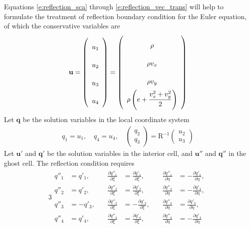 \documentclass[a4paper,12pt,dvips]{article}
\begin{document}
Equations \ref{e:reflection_sca} through \ref{e:reflection_vec_trans} will help
to formulate the treatment of reflection boundary condition for the Euler
equation, of which the conservative variables are
\begin{align*}
\renewcommand{\arraystretch}{2.2}
\mathbf{u} = \left(\begin{array}{c}
  u_1 \\ u_2 \\ u_3 \\ u_4
\end{array}\right)
= \left(\begin{array}{c}
  \rho \\ \rho v_x \\ \rho v_y \\
  \rho\left(e + \dfrac{v_x^2 + v_y^2}{2}\right)
\end{array}\right)
\end{align*}
Let $\mathbf{q}$ be the solution variables in the local coordinate system
\begin{align*}
q_1 = u_1, \quad q_4 = u_4, \quad
\left(\begin{array}{c}
  q_2 \\ q_3
\end{array}\right)
= \mathrm{R}^{-1} \left(\begin{array}{c}
  u_2 \\ u_3
\end{array}\right)
\end{align*}
Let $\mathbf{u}'$ and $\mathbf{q}'$ be the solution variables in the interior
cell, and $\mathbf{u}''$ and $\mathbf{q}''$ in the ghost cell.  The reflection
condition requires
\begin{alignat*}{3}
\begin{aligned}
  q''_1
  &= q'_1, \quad
  &\frac{\partial q''_1}{\partial\xi}
  &= \frac{\partial q'_1}{\partial\xi}, \quad
  &\frac{\partial q''_1}{\partial\eta}
  &= -\frac{\partial q'_1}{\partial\eta}, \\
  q''_2
  &= q'_2, \quad
  &\frac{\partial q''_2}{\partial\xi}
  &= \frac{\partial q'_2}{\partial\xi}, \quad
  &\frac{\partial q''_2}{\partial\eta}
  &= -\frac{\partial q'_2}{\partial\eta}, \\
  q''_3
  &= -q'_3, \quad
  &\frac{\partial q''_3}{\partial\xi}
  &= -\frac{\partial q'_3}{\partial\xi}, \quad
  &\frac{\partial q''_3}{\partial\eta}
  &= \frac{\partial q'_3}{\partial\eta}, \\
  q''_4
  &= q'_4, \quad
  &\frac{\partial q''_4}{\partial\xi}
  &= \frac{\partial q'_4}{\partial\xi}, \quad
  &\frac{\partial q''_4}{\partial\eta}
  &= -\frac{\partial q'_4}{\partial\eta}
\end{aligned}
\end{alignat*}
\end{document}
